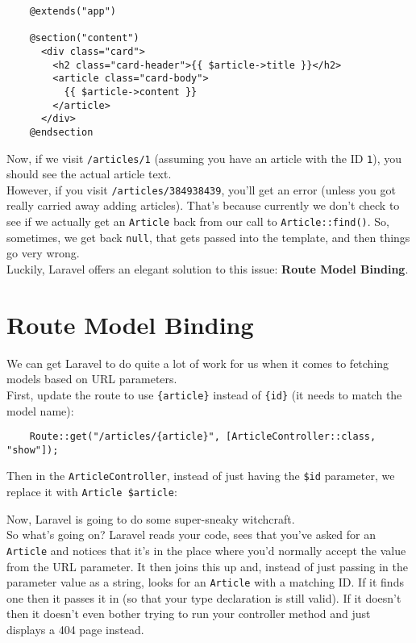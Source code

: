 \begin{verbatim}
    @extends("app")

    @section("content")
      <div class="card">
        <h2 class="card-header">{{ $article->title }}</h2>
        <article class="card-body">
          {{ $article->content }}
        </article>
      </div>
    @endsection
\end{verbatim}

Now, if we visit \texttt{/articles/1} (assuming you have an article with the ID \texttt{1}), you should see the actual article text.
\\

However, if you visit \texttt{/articles/384938439}, you'll get an error (unless you got really carried away adding articles). That's because currently we don't check to see if we actually get an \texttt{Article} back from our call to \texttt{Article::find()}. So, sometimes, we get back \texttt{null}, that gets passed into the template, and then things go very wrong.
\\

Luckily, Laravel offers an elegant solution to this issue: \textbf{Route Model Binding}.


\section{Route Model Binding}

We can get Laravel to do quite a lot of work for us when it comes to fetching models based on URL parameters.
\\

First, update the route to use \texttt{\{article\}} instead of \texttt{\{id\}} (it needs to match the model name):

\begin{verbatim}
    Route::get("/articles/{article}", [ArticleController::class, "show"]);
\end{verbatim}

Then in the \texttt{ArticleController}, instead of just having the \texttt{\$id} parameter, we replace it with \texttt{Article \$article}:


Now, Laravel is going to do some super-sneaky witchcraft.
\\

So what's going on? Laravel reads your code, sees that you've asked for an \texttt{Article} and notices that it's in the place where you'd normally accept the value from the URL parameter. It then joins this up and, instead of just passing in the parameter value as a string, looks for an \texttt{Article} with a matching ID. If it finds one then it passes it in (so that your type declaration is still valid). If it doesn't then it doesn't even bother trying to run your controller method and just displays a 404 page instead.
\\


